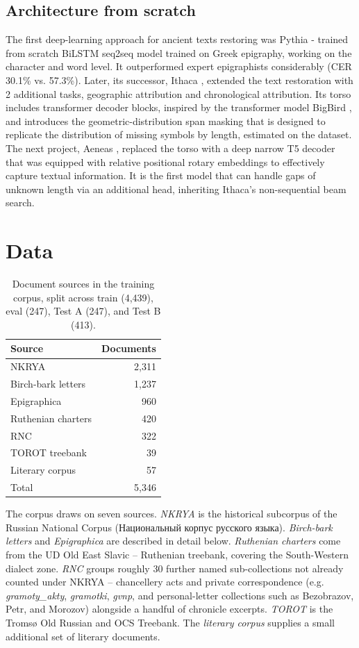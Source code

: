 \documentclass{article}
\begin{document}
\subsection{Architecture from scratch}
The first deep-learning approach for ancient texts restoring was Pythia \cite{assael2019} - trained from scratch BiLSTM seq2seq model trained on Greek epigraphy, working on the character and word level. It outperformed expert epigraphists considerably (CER 30.1\% vs. 57.3\%).
Later, its successor, Ithaca \cite{assael2022}, extended the text restoration with 2 additional tasks, geographic attribution and chronological attribution. Its torso includes transformer decoder blocks, inspired by the transformer model BigBird \cite{zaheer2020bigbird}, and introduces the geometric-distribution span masking that is designed to replicate the distribution of missing symbols by length, estimated on the dataset.
The next project, Aeneas \cite{assael2025}, replaced the torso with a deep narrow T5 \cite{raffel2020t5} decoder that was equipped with relative positional rotary embeddings \cite{su2021} to effectively capture textual information. It is the first model that can handle gaps of unknown length via an additional head, inheriting Ithaca's non-sequential beam search.


\section{Data}
\label{sec:Data}
\begin{table}[H]
\centering
\begin{tabular}{|l|r|}
\hline
Source & Documents \\
\hline
NKRYA & 2{,}311 \\
Birch-bark letters & 1{,}237 \\
Epigraphica & 960 \\
Ruthenian charters & 420 \\
RNC & 322 \\
TOROT treebank & 39 \\
Literary corpus & 57 \\
\hline
Total & 5{,}346 \\
\hline
\end{tabular}
\caption{Document sources in the training corpus, split across train (4{,}439), eval (247), Test A (247), and Test B (413).}
\label{tab:sources}
\end{table}

The corpus draws on seven sources. \emph{NKRYA} is the historical subcorpus of the Russian National Corpus (Национальный корпус русского языка). \emph{Birch-bark letters} and \emph{Epigraphica} are described in detail below. \emph{Ruthenian charters} come from the UD Old East Slavic -- Ruthenian treebank, covering the South-Western dialect zone. \emph{RNC} groups roughly 30 further named sub-collections not already counted under NKRYA -- chancellery acts and private correspondence (e.g. \emph{gramoty\_akty}, \emph{gramotki}, \emph{gvnp}, and personal-letter collections such as Bezobrazov, Petr, and Morozov) alongside a handful of chronicle excerpts. \emph{TOROT} is the Tromsø Old Russian and OCS Treebank. The \emph{literary corpus} supplies a small additional set of literary documents.
\end{document}
